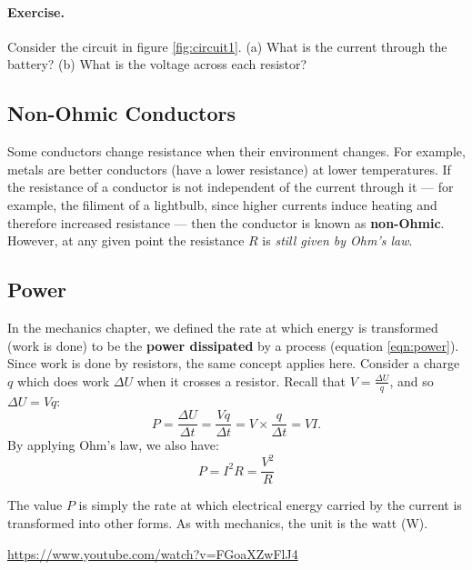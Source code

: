 \documentclass[a4paper]{amsbook}
\begin{document}
\paragraph{Exercise.} Consider the circuit in figure \ref{fig:circuit1}. (a) What is the current through the battery? (b) What is the voltage
across each resistor?

\subsection{Non-Ohmic Conductors}
Some conductors change resistance when their environment changes. For example, metals are better conductors (have a lower
resistance) at lower temperatures. If the resistance of a conductor is not independent of the current through it --- for example,
the filiment of a lightbulb, since higher currents induce heating and therefore increased resistance --- then the conductor
is known as \textbf{non-Ohmic}. However, at any given point the resistance $ R $ is \textit{still given by Ohm's law}.

\subsection{Power}
In the mechanics chapter, we defined the rate at which energy is transformed (work is done) to be the \textbf{power dissipated}
by a process (equation \ref{eqn:power}). Since work is done by resistors, the same concept applies here. Consider a charge $ q $
which does work $ \Delta U $ when it crosses a resistor. Recall that $ V = \frac{\Delta U}{q} $, and so $ \Delta U = Vq $:
\begin{equation}
  P = \frac{\Delta U}{\Delta t} = \frac{Vq}{\Delta t} = V \times \frac{q}{\Delta t} = VI.
\end{equation}
By applying Ohm's law, we also have:
\begin{equation}
  P = I^2 R = \frac{V^2}{R}
\end{equation}

The value $ P $ is simply the rate at which electrical energy carried by the current is transformed into other forms. As with mechanics,
the unit is the watt (W).

\begin{center}
\begin{tcolorbox}[width=0.8\textwidth,colback={red},title={\textbf{Go and watch...}},colbacktitle=yellow,coltitle=blue]
  \textcolor{white}{\url{https://www.youtube.com/watch?v=FGoaXZwFlJ4}}
\end{tcolorbox}
\end{center}
\end{document}
